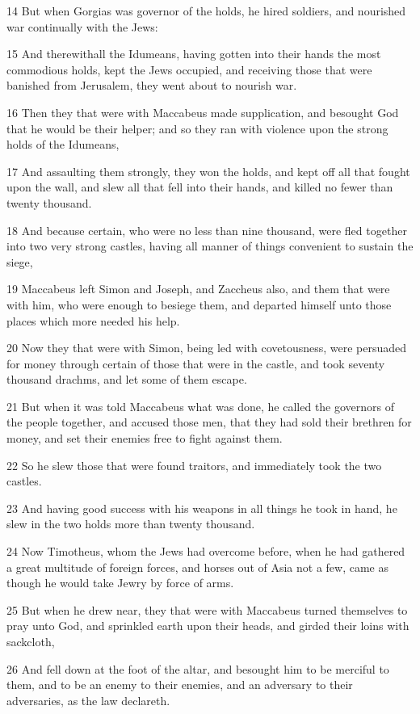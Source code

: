 \par 14 But when Gorgias was governor of the holds, he hired soldiers, and nourished war continually with the Jews:
\par 15 And therewithall the Idumeans, having gotten into their hands the most commodious holds, kept the Jews occupied, and receiving those that were banished from Jerusalem, they went about to nourish war.
\par 16 Then they that were with Maccabeus made supplication, and besought God that he would be their helper; and so they ran with violence upon the strong holds of the Idumeans,
\par 17 And assaulting them strongly, they won the holds, and kept off all that fought upon the wall, and slew all that fell into their hands, and killed no fewer than twenty thousand.
\par 18 And because certain, who were no less than nine thousand, were fled together into two very strong castles, having all manner of things convenient to sustain the siege,
\par 19 Maccabeus left Simon and Joseph, and Zaccheus also, and them that were with him, who were enough to besiege them, and departed himself unto those places which more needed his help.
\par 20 Now they that were with Simon, being led with covetousness, were persuaded for money through certain of those that were in the castle, and took seventy thousand drachms, and let some of them escape.
\par 21 But when it was told Maccabeus what was done, he called the governors of the people together, and accused those men, that they had sold their brethren for money, and set their enemies free to fight against them.
\par 22 So he slew those that were found traitors, and immediately took the two castles.
\par 23 And having good success with his weapons in all things he took in hand, he slew in the two holds more than twenty thousand.
\par 24 Now Timotheus, whom the Jews had overcome before, when he had gathered a great multitude of foreign forces, and horses out of Asia not a few, came as though he would take Jewry by force of arms.
\par 25 But when he drew near, they that were with Maccabeus turned themselves to pray unto God, and sprinkled earth upon their heads, and girded their loins with sackcloth,
\par 26 And fell down at the foot of the altar, and besought him to be merciful to them, and to be an enemy to their enemies, and an adversary to their adversaries, as the law declareth.
